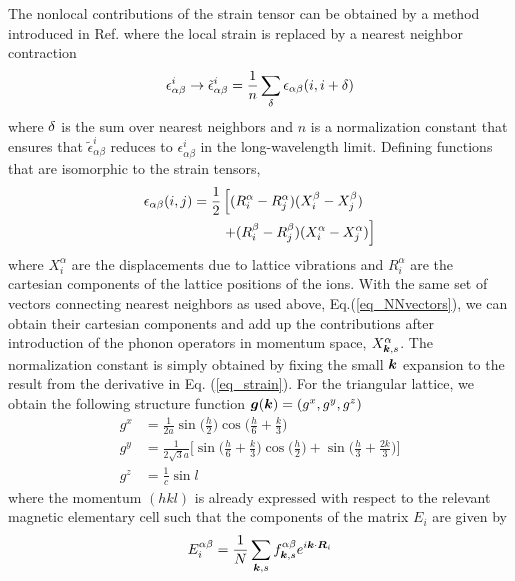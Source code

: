 \documentclass[aps,prl,twocolumn,superscriptaddress,amsmath,amssymb,floats,aps,10pt]{revtex4-1}
\begin{document}
The nonlocal contributions of the strain tensor can be obtained by a method introduced in Ref. \cite{Evenson69}
where the local strain is replaced by a nearest neighbor contraction
\begin{equation}
\epsilon_{\alpha\beta}^i \rightarrow \tilde\epsilon_{\alpha\beta}^i=\frac 1 n \sum_{\bf \delta} \epsilon_{\alpha\beta}(i,i+\bf \delta)
\end{equation}
where ${\bf \delta}$ is the sum over nearest neighbors and $n$ is a normalization constant that ensures that
$\tilde\epsilon_{\alpha\beta}^i$ reduces to $\epsilon_{\alpha\beta}^i$ in the long-wavelength limit\cite{Jensen_risoe}.
Defining functions that are isomorphic to the strain tensors,
\begin{align}
 \epsilon_{\alpha\beta}(i,j)=\frac 12 &\left[(R_i^\alpha-R_j^\alpha)(X_i^\beta-X_j^\beta)\right.\notag\\
 &\left.+(R_i^\beta-R_j^\beta)(X_i^\alpha-X_j^\alpha)\right]
\end{align}
where $X_i^\alpha$ are the displacements due to lattice vibrations and $R_i^\alpha$ are the cartesian components of the lattice positions of the ions.
With the same set of vectors connecting nearest neighbors as used above, Eq.(\ref{eq_NNvectors}), we can obtain their cartesian components and add
up the contributions after introduction of the phonon operators in momentum space, $X_{\bm k,s}^\alpha$. The normalization constant is simply obtained
by fixing the small $\bm k$ expansion to the result from the derivative in Eq. (\ref{eq_strain}).
For the triangular lattice, we obtain the following structure function $\bm g(\bm k)=(g^{x},g^{y},g^{z})$
\begin{subequations}
 \begin{align}
 g^{x}&=\frac 1{2a}\sin\biggl(\frac h 2\biggr)\cos\biggl(\frac h 6+\frac k 3\biggr)\\
 g^{y}&=\frac 1{2\sqrt{3}a}\biggl[\sin\biggl(\frac{h}{6}+\frac{k}{3}\biggr)\cos\biggl(\frac{h}{2}\biggr)+\sin\biggl(\frac{h}{3}+\frac{2k}{3}\biggr)\biggr]\\
     g^{z}&=\frac 1 c \sin l
  \end{align}
\end{subequations}
where the momentum $(hkl)$ is already expressed with respect to the relevant magnetic elementary cell such that the components of the matrix $E_i$ are given by
\begin{equation}
 E_i^{\alpha\beta}=\frac{1}{N}\sum_{\bm k, s} f_{\bm k,s}^{\alpha \beta} e^{i\bm k\cdot \bm R_i}
\end{equation}
\end{document}
